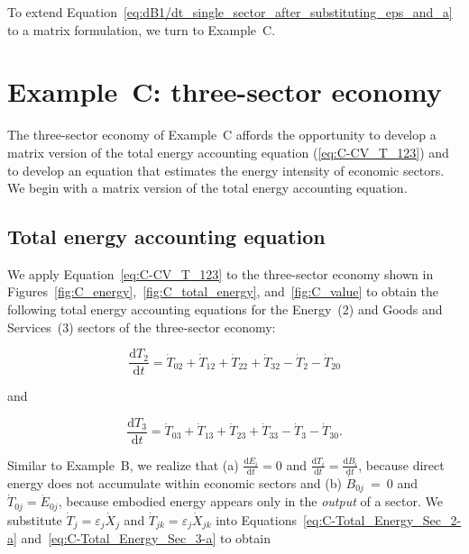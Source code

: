 To extend Equation~\ref{eq:dB1/dt_single_sector_after_substituting_eps_and_a}
to a matrix formulation, we turn to Example~C.


\section{Example~C: three-sector economy} %
\label{sec:C-intensity}

The three-sector economy of Example~C affords the opportunity 
to develop a matrix version 
of the total energy accounting equation (\ref{eq:C-CV_T_123})
and to develop an equation that estimates the
energy intensity of economic sectors. 
We begin with a matrix version of the total energy accounting equation.


\subsection{Total energy accounting equation}

We apply Equation~\ref{eq:C-CV_T_123} to the three-sector
economy shown in 
Figures~\ref{fig:C_energy},~\ref{fig:C_total_energy}, and~\ref{fig:C_value}
to obtain the following total energy accounting equations
for the Energy~(2) and Goods and Services~(3) sectors 
of the three-sector economy:

\begin{equation} \label{eq:C-Total_Energy_Sec_2-a}
	\frac{\mathrm{d}T_{2}}{\mathrm{d}t} 
	= \dot{T}_{02}  
	+ \dot{T}_{12}
	+ \dot{T}_{22}
	+ \dot{T}_{32}
	- \dot{T}_{2}
	- \dot{T}_{20}
\end{equation}

\noindent{}and

\begin{equation} \label{eq:C-Total_Energy_Sec_3-a}
	\frac{\mathrm{d}T_{3}}{\mathrm{d}t} 
	= \dot{T}_{03}  
	+ \dot{T}_{13}
	+ \dot{T}_{23}
	+ \dot{T}_{33}
	- \dot{T}_{3}
	- \dot{T}_{30}.
\end{equation}

\noindent{}Similar to Example~B, we realize that 
(a) $\frac{\mathrm{d}E_i}{\mathrm{d}t} = 0$
and
$\frac{\mathrm{d}T_i}{\mathrm{d}t} = \frac{\mathrm{d}B_i}{\mathrm{d}t}$, 
because direct energy
does not accumulate within economic sectors and
(b) $\dot{B}_{0j}~=~0$ and $\dot{T}_{0j} = \dot{E}_{0j}$,
because embodied energy appears only in the \emph{output} of a sector.
We substitute $\dot{T}_{j} = \varepsilon_{j} \dot{X}_{j}$ 
and $\dot{T}_{jk} = \varepsilon_{j} \dot{X}_{jk}$ 
into Equations~\ref{eq:C-Total_Energy_Sec_2-a}
and~\ref{eq:C-Total_Energy_Sec_3-a} to obtain

